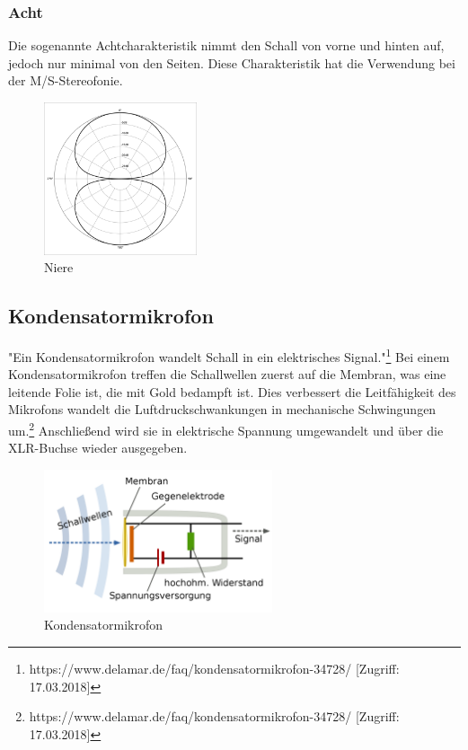 \subsubsection{Acht}
Die sogenannte Achtcharakteristik nimmt den Schall von vorne und hinten auf, jedoch nur minimal von den Seiten. Diese Charakteristik hat die Verwendung bei der M/S-Stereofonie.  
\begin{figure}[h]
	\centering
	\includegraphics[width=0.4\textwidth]{abb7} 
	\caption{Niere}
\end{figure}
\subsection{Kondensatormikrofon}
"Ein Kondensatormikrofon wandelt Schall in ein elektrisches Signal."\footnote{\label{foot:10}https://www.delamar.de/faq/kondensatormikrofon-34728/ [Zugriff: 17.03.2018]} Bei einem Kondensatormikrofon treffen die Schallwellen zuerst auf die Membran, was eine leitende Folie ist, die mit Gold bedampft ist. Dies verbessert die  Leitfähigkeit des Mikrofons wandelt die Luftdruckschwankungen in mechanische Schwingungen um.\footnote{\label{foot:11}https://www.delamar.de/faq/kondensatormikrofon-34728/ [Zugriff: 17.03.2018]} Anschließend wird sie in elektrische Spannung umgewandelt und über die XLR-Buchse wieder ausgegeben. 
\begin{figure}[h]
	\centering
	\includegraphics[width=0.6\textwidth]{abb8} 
	\caption{Kondensatormikrofon}
\end{figure}
